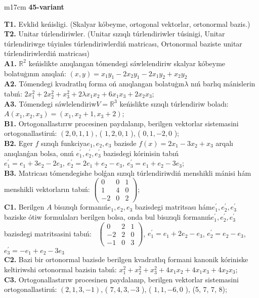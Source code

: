 \documentclass{article}
\begin{document}
\begin{tabular}{m{17cm}}
\textbf{45-variant}
\newline

\textbf{T1.} Evklid keńisligi. (Skalyar kóbeyme, ortogonal vektorlar, ortonormal bazis.) \\
\textbf{T2.} Unitar túrlendiriwler. (Unitar sızıqlı túrlendiriwler túsinigi,  Unitar túrlendiriwge túyinles túrlendiriwlerdiń matricası,   Ortonormal baziste unitar túrlendiriwlerdiń matricası) \\
\textbf{A1.} \(\mathbb{R}^{2}\) keńislikte anıqlangan tómendegi sáwlelendiriw skalyar kóbeyme bolatuģının anıqlań: \((x,y) = x_{1}y_{1} - 2x_{2}y_{1} - 2x_{1}y_{2} + x_{2}y_{2}\) \\
\textbf{A2.} Tómendegi kvadratlıq forma oń anıqlangan bolatuģın\(\lambda\) nıń barlıq mánislerin tabıń: \(2x_{1}^{2} + 2x_{2}^{2} + x_{3}^{2} + 2\lambda x_{1}x_{2} + 6x_{1}x_{3} + 2x_{2}x_{3}\); \\
\textbf{A3.} Tómendegi sáwlelendiriw\(V = \mathbb{R}^{3}\) keńislikte sızıqlı túrlendiriw boladı: \(A\left( x_{1},x_{2},x_{3} \right) = \left( x_{1},x_{2} + 1,x_{3} + 2 \right)\); \\
\textbf{B1.} Ortogonallastırıw procesinen paydalanıp, berilgen vektorlar sistemasini ortogonallastirıń: \((2,0,1,1)\), ( \(1,2,0,1\) ), ( \(0,1, - 2,0\) ); \\
\textbf{B2.} Eger \(f\) sızıqlı funkciya\(e_{1},e_{2},e_{3}\) bazisde \(f(x) = 2x_{1} - 3x_{2} + x_{3}\) arqalı anıqlanǵan bolsa, onıń \(e_{1}^{'},e_{2}^{'},e_{3}^{'}\) bazisdegi kórinisin tabıń\(e_{1}^{'} = e_{1} + 3e_{2} - 2e_{3},\ e_{2}^{'} = 2e_{1} + e_{2} - e_{3},\ e_{3}^{'} = e_{1} + e_{2} - 3e_{3}\); \\
\textbf{B3.} Matricası tómendegishe bolǵan sızıqlı túrlendiriwdiń menshikli mánisi hám menshikli vektorların tabıń: \(\begin{pmatrix} 0 & 0 & 1 \\ 1 & 4 & 0 \\  - 2 & 0 & 2 \end{pmatrix}\); \\
\textbf{C1.} Berilgen \(A\) bisızıqlı formanıń\(e_{1},e_{2},e_{3}\) bazisdegi matritsası hám\(e_{1}^{'},e_{2}^{'},e_{3}^{'}\) baziske ótiw formulaları berilgen bolsa, onda bul bisızıqli formanıń\(e_{1}^{'},e_{2}^{'},e_{3}^{'}\) bazisdegi matritsasini tabıń: \(\ \) \(\begin{pmatrix} 0 & 2 & 1 \\  - 2 & 2 & 0 \\  - 1 & 0 & 3 \end{pmatrix}\), \(e_{1}^{'} = e_{1} + 2e_{2} - e_{3}\), \(e_{2}^{'} = e_{2} - e_{3}\), \(e_{3}^{'} = - e_{1} + e_{2} - 3e_{3}\) \\
\textbf{C2.} Bazi bir ortonormal bazisde berilgen kvadratlıq formani kanonik kóriniske keltiriwshi ortonormal bazisin tabıń: \(x_{1}^{2} + x_{2}^{2} + x_{3}^{2} + 4x_{1}x_{2} + 4x_{1}x_{3} + 4x_{2}x_{3}\); \\
\textbf{C3.} Ortogonallastırıw procesinen paydalanıp, berilgen vektorlar sistemasini ortogonallastirıń: \((2,1,3, - 1)\), ( \(7,4,3, - 3\) ), ( \(1,1, - 6,0\) ), (5, 7, 7, 8); \\

\end{tabular}
\end{document}
